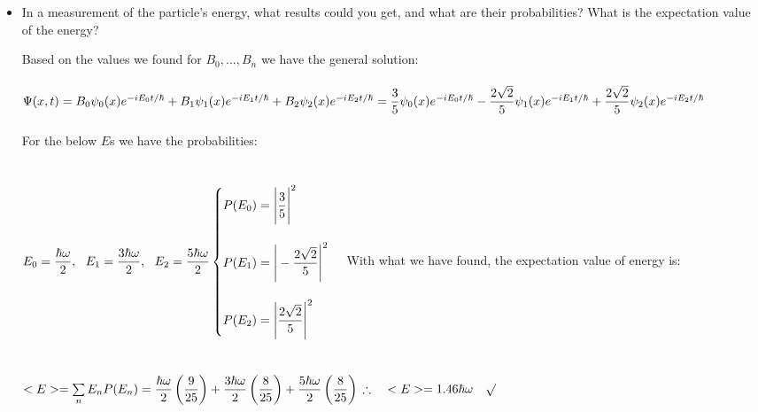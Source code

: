 \documentclass[fleqn]{article}
\begin{document}
\begin{itemize}
    \item In a measurement of the particle’s energy, what results could you get, and
    what are their probabilities? What is the expectation value of the energy?

      \textcolor{hwColor}{
        Based on the values we found for $B_0, ..., B_n$ we have the general solution: \\
        \\
        $
          \Psi(x,t)=B_0 \psi_0(x) e^{-iE_0 t/\hbar}+B_1 \psi_1(x) e^{-iE_1 t/\hbar}+B_2 \psi_2(x) e^{-iE_2 t/\hbar} \\
          \\
          =\dfrac{3}{5} \psi_0(x) e^{-iE_0 t/\hbar}-\dfrac{2\sqrt{2}}{5} \psi_1(x) e^{-iE_1 t/\hbar}+\dfrac{2\sqrt{2}}{5} \psi_2(x) e^{-iE_2 t/\hbar}
        $
        \\
        \\
        For the below $E$s we have the probabilities: \\
        \\
        \\
        $
          E_0=\dfrac{\hbar \omega}{2}, ~~ 
          E_1=\dfrac{3\hbar \omega}{2}, ~~
          E_2=\dfrac{5\hbar \omega}{2} \\
          \\
          \\
          \begin{cases}
            P(E_0)=\Bigg|\dfrac{3}{5}\Bigg|^2 \\
            \\
            P(E_1)=\Bigg|-\dfrac{2\sqrt{2}}{5}\Bigg|^2 \\
            \\
            P(E_2)=\Bigg|\dfrac{2\sqrt{2}}{5}\Bigg|^2
          \end{cases}
        $
        With what we have found, the expectation value of energy is: \\
        \\
        \\
        $
          <E>=\sum\limits_{n} E_n P(E_n)=
          \dfrac{\hbar \omega}{2} \left(\dfrac{9}{25}\right)+
          \dfrac{3\hbar \omega}{2} \left(\dfrac{8}{25}\right)+
          \dfrac{5\hbar \omega}{2} \left(\dfrac{8}{25}\right) \\
          \\
          \\
          \\
          \therefore ~~~~ <E>=1.46 \hbar \omega ~~~ \surd
        $
      }


\end{itemize}
\end{document}
